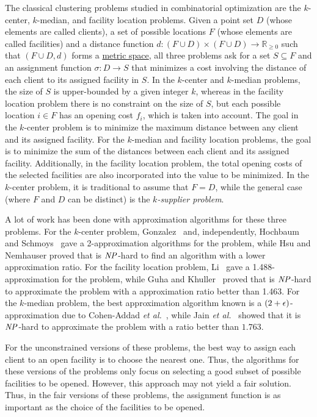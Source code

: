 \documentclass[12pt]{article}
\begin{document}
The classical clustering problems studied in combinatorial optimization are the $k$-center, $k$-median, and facility location problems. 
Given a point set $D$ (whose elements are called clients), a set of possible locations $F$ (whose elements are called facilities) and a distance function $d : (F \cup D) \times (F \cup D) \rightarrow \mathbb{R}_{\geq 0}$ such that $(F\cup D, d)$ forms a \href{https://en.wikipedia.org/wiki/Metric_space}{metric space}, all three problems ask for a set $S \subseteq F$ and an assignment function $\sigma : D \rightarrow S$ that minimizes a cost involving the distance of each client to its assigned facility in $S$. 
In the $k$-center and $k$-median problems, the size of $S$ is upper-bounded by a given integer $k$, whereas in the facility location problem there is no constraint on the size of $S$, but each possible location $i \in F$ has an opening cost $f_i$, which is taken into account. 
The goal in the $k$-center problem is to minimize the maximum distance between any client and its assigned facility. 
For the $k$-median and facility location problems, the goal is to minimize the sum of the distances between each client and its assigned facility. 
Additionally, in the facility location problem, the total opening costs of the selected facilities are also incorporated into the value to be minimized. 
In the $k$-center problem, it is traditional to assume that $F=D$, while the general case (where $F$ and $D$ can be distinct) is the \emph{$k$-supplier problem}.

A lot of work has been done with approximation algorithms for these three problems. For the $k$-center problem, Gonzalez~\cite{G1985} and, independently, Hochbaum and Schmoys~\cite{HS1985} gave a 2-approximation algorithms for the problem, while Hsu and Nemhauser proved that is $\mathit{NP}$-hard to find an algorithm with a lower approximation ratio. For the facility location problem, Li~\cite{L2013} gave a 1.488-approximation for the problem, while Guha and Khuller~\cite{GK1999} proved that is $\mathit{NP}$-hard to approximate the problem with a approximation ratio better than 1.463. For the $k$-median problem, the best approximation algorithm known is a $(2 + \epsilon)$-approximation due to Cohen-Addad \emph{et al.}~\cite{CGLS2025}, while Jain \emph{et al.}~\cite{JMS2002} showed that it is $\mathit{NP}$-hard to approximate the problem with a ratio better than $1.763$.

For the unconstrained versions of these problems, the best way to assign each client to an open facility is to choose the nearest one. Thus, the algorithms for these versions of the problems only focus on selecting a good subset of possible facilities to be opened. However, this approach may not yield a fair solution. Thus, in the fair versions of these problems, the assignment function is as important as the choice of the facilities to be opened.
\end{document}
